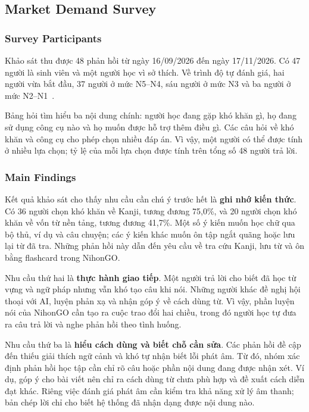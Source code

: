 \subsection{Market Demand Survey}

\subsubsection{Survey Participants}

Khảo sát thu được 48 phản hồi từ ngày 16/09/2026 đến ngày 17/11/2026. Có 47 người là sinh viên và một người học vì sở thích. Về trình độ tự đánh giá, hai người vừa bắt đầu, 37 người ở mức N5--N4, sáu người ở mức N3 và ba người ở mức N2--N1~\cite{nihongo-survey2026}.

Bảng hỏi tìm hiểu ba nội dung chính: người học đang gặp khó khăn gì, họ đang sử dụng công cụ nào và họ muốn được hỗ trợ thêm điều gì. Các câu hỏi về khó khăn và công cụ cho phép chọn nhiều đáp án. Vì vậy, một người có thể được tính ở nhiều lựa chọn; tỷ lệ của mỗi lựa chọn được tính trên tổng số 48 người trả lời.

\subsubsection{Main Findings}

Kết quả khảo sát cho thấy nhu cầu cần chú ý trước hết là \textbf{ghi nhớ kiến thức}. Có 36 người chọn khó khăn về Kanji, tương đương 75,0\%, và 20 người chọn khó khăn về vốn từ nền tảng, tương đương 41,7\%. Một số ý kiến muốn học chữ qua bộ thủ, ví dụ và câu chuyện; các ý kiến khác muốn ôn tập ngắt quãng hoặc lưu lại từ đã tra. Những phản hồi này dẫn đến yêu cầu về tra cứu Kanji, lưu từ và ôn bằng flashcard trong NihonGO.

Nhu cầu thứ hai là \textbf{thực hành giao tiếp}. Một người trả lời cho biết đã học từ vựng và ngữ pháp nhưng vẫn khó tạo câu khi nói. Những người khác đề nghị hội thoại với AI, luyện phản xạ và nhận góp ý về cách dùng từ. Vì vậy, phần luyện nói của NihonGO cần tạo ra cuộc trao đổi hai chiều, trong đó người học tự đưa ra câu trả lời và nghe phản hồi theo tình huống.

Nhu cầu thứ ba là \textbf{hiểu cách dùng và biết chỗ cần sửa}. Các phản hồi đề cập đến thiếu giải thích ngữ cảnh và khó tự nhận biết lỗi phát âm. Từ đó, nhóm xác định phản hồi học tập cần chỉ rõ câu hoặc phần nội dung đang được nhận xét. Ví dụ, góp ý cho bài viết nên chỉ ra cách dùng từ chưa phù hợp và đề xuất cách diễn đạt khác. Riêng việc đánh giá phát âm cần kiểm tra khả năng xử lý âm thanh; bản chép lời chỉ cho biết hệ thống đã nhận dạng được nội dung nào.

